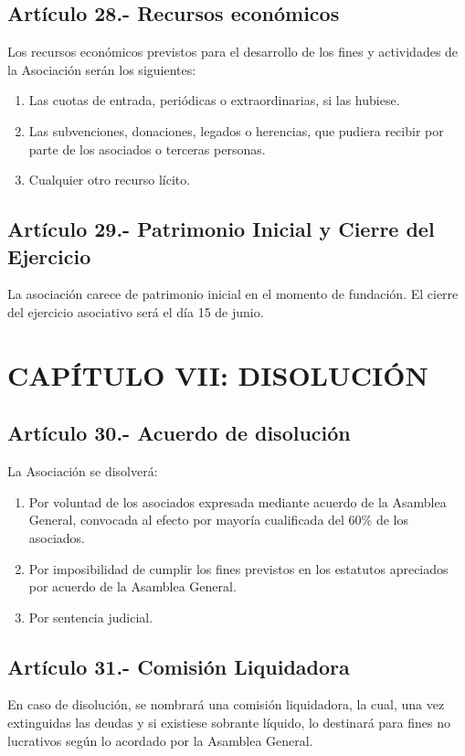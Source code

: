 \documentclass[10pt, spanish, pdftex]{gulplantilla}
\begin{document}
\subsection{Artículo 28.- Recursos económicos}
Los recursos económicos previstos para el desarrollo de los fines y actividades de la Asociación serán los siguientes:
\begin{enumerate}[label=\alph*)]
    \item Las cuotas de entrada, periódicas o extraordinarias, si las hubiese.
    \item Las subvenciones, donaciones, legados o herencias, que pudiera recibir por parte de los asociados o terceras personas.
    \item Cualquier otro recurso lícito.
\end{enumerate}

\subsection{Artículo 29.- Patrimonio Inicial y Cierre del Ejercicio}
La asociación carece de patrimonio inicial en el momento de fundación. El cierre del ejercicio asociativo será el día 15 de junio.


\newpage {}
\section{CAPÍTULO VII: DISOLUCIÓN}


\subsection{Artículo 30.- Acuerdo de disolución}
La Asociación se disolverá:
\begin{enumerate}[label=\alph*)]
    \item Por voluntad de los asociados expresada mediante acuerdo de la Asamblea General, convocada al efecto por mayoría cualificada del 60\% de los asociados.
    \item Por imposibilidad de cumplir los fines previstos en los estatutos apreciados por acuerdo de la Asamblea General.
    \item Por sentencia judicial.
\end{enumerate}

\subsection{Artículo 31.- Comisión Liquidadora}
En caso de disolución, se nombrará una comisión liquidadora, la cual, una vez extinguidas las deudas y si existiese sobrante líquido, lo destinará para fines no lucrativos según lo acordado por la Asamblea General.
\end{document}
